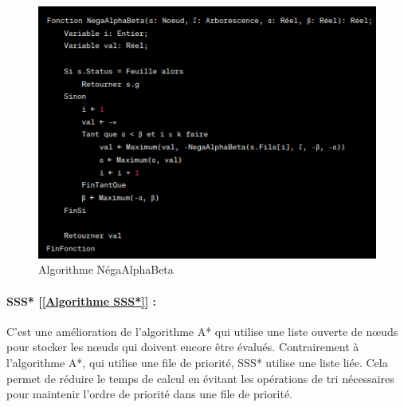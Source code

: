 \documentclass[12pt]{article}
\begin{document}
	\begin{figure}[H]
		\centering
		\includegraphics[scale=0.7]{img/negaalphabeta}
		\caption{Algorithme NégaAlphaBeta }
		\label{Algorithme NégaAlphaBeta}
	\end{figure}
	
	\paragraph{SSS* [\ref{Algorithme SSS*}] :} C'est une amélioration de l'algorithme A* qui utilise une liste ouverte de nœuds pour stocker les nœuds qui doivent encore être évalués. Contrairement à l'algorithme A*, qui utilise une file de priorité, SSS* utilise une liste liée. Cela permet de réduire le temps de calcul en évitant les opérations de tri nécessaires pour maintenir l'ordre de priorité dans une file de priorité.
	
\end{document}
